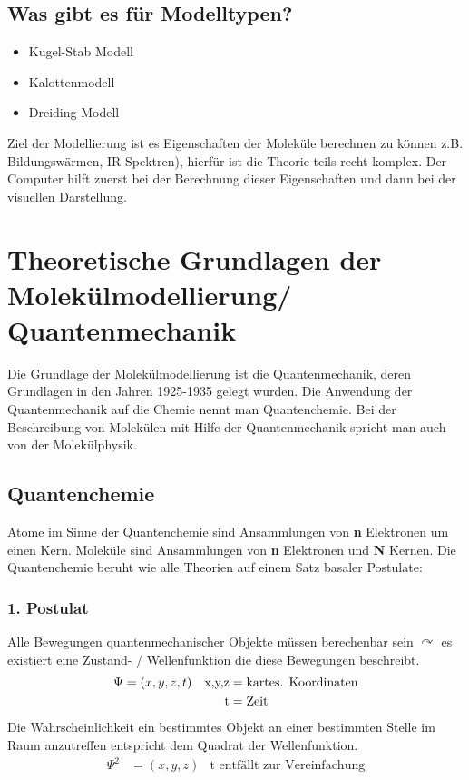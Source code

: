 \documentclass[12pt,a4paper,oneside,normalheadings,abstracton,liststotoc,bibtotoc,titlepage,pdftex]{scrartcl}
\begin{document}
\subsection{Was gibt es für Modelltypen?}
\begin{itemize}
\item Kugel-Stab Modell
\item Kalottenmodell
\item Dreiding Modell
\end{itemize}
Ziel der Modellierung ist es Eigenschaften der Moleküle berechnen zu können z.B. Bildungswärmen, IR-Spektren), hierfür ist die Theorie teils recht komplex. Der Computer hilft zuerst bei der Berechnung dieser Eigenschaften und dann bei der visuellen Darstellung.

\section{Theoretische Grundlagen der Molekülmodellierung/ Quantenmechanik}

Die Grundlage der Molekülmodellierung ist die Quantenmechanik, deren Grundlagen in den Jahren 1925-1935 gelegt wurden. Die Anwendung der Quantenmechanik auf die Chemie nennt man Quantenchemie. Bei der Beschreibung von Molekülen mit Hilfe der Quantenmechanik spricht man auch von der Molekülphysik.

\subsection{Quantenchemie}

Atome im Sinne der Quantenchemie sind Ansammlungen von \textbf{n} Elektronen um einen Kern. Moleküle sind Ansammlungen von \textbf{n} Elektronen und \textbf{N} Kernen. Die Quantenchemie beruht wie alle Theorien auf einem Satz basaler Postulate:
\subsubsection*{1. Postulat}
Alle Bewegungen quantenmechanischer Objekte müssen berechenbar sein $\curvearrowright$ es existiert eine Zustand- / Wellenfunktion die diese Bewegungen beschreibt.
\begin{align}
\Psi &=(x,y,z,t)& \text{x,y,z} &= \text{kartes. Koordinaten} \\
\notag && \text{t} &= \text{Zeit}
\end{align}
Die Wahrscheinlichkeit ein bestimmtes Objekt an einer bestimmten Stelle im Raum anzutreffen entspricht dem Quadrat der Wellenfunktion.
\begin{align}
\Psi^2 &=(x,y,z)& \text{t entfällt zur Vereinfachung}
\end{align}
\end{document}
